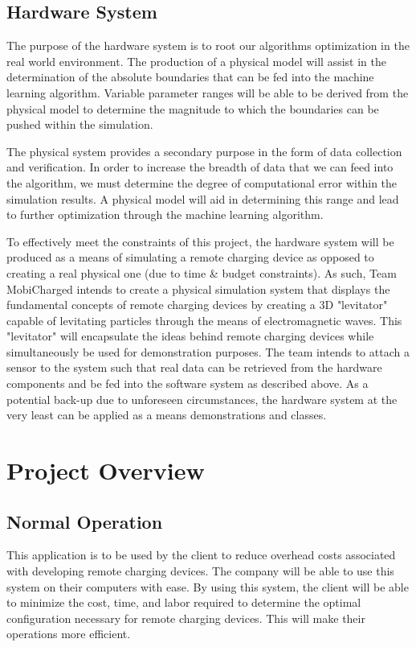 \documentclass[12pt, titlepage]{article}
\begin{document}
\subsection{Hardware System}
The purpose of the hardware system is to root our algorithms optimization in the real world environment. The production of a physical model will assist in the determination of the absolute boundaries that can be fed into the machine learning algorithm. Variable parameter ranges will be able to be derived from the physical model to determine the magnitude to which the boundaries can be pushed within the simulation. 
\par
The physical system provides a secondary purpose in the form of data collection and verification. In order to increase the breadth of data that we can feed into the algorithm, we must determine the degree of computational error within the simulation results. A physical model will aid in determining this range and lead to further optimization through the machine learning algorithm. 
\par
To effectively meet the constraints of this project, the hardware system will be produced as a means of simulating a remote charging device as opposed to creating a real physical one (due to time \& budget constraints). As such, Team MobiCharged intends to create a physical simulation system that displays the fundamental concepts of remote charging devices by creating a 3D "levitator" capable of levitating particles through the means of electromagnetic waves. This "levitator" will encapsulate the ideas behind remote charging devices while simultaneously be used for demonstration purposes. The team intends to attach a sensor to the system such that real data can be retrieved from the hardware components and be fed into the software system as described above. As a potential back-up due to unforeseen circumstances, the hardware system at the very least can be applied as a means demonstrations and classes.   

\section{Project Overview}
\subsection{Normal Operation}
This application is to be used by the client to reduce overhead costs associated with developing remote charging devices. The company will be able to use this system on their computers with ease. By using this system, the client will be able to minimize the cost, time, and labor required to determine the optimal configuration necessary for remote charging devices. This will make their operations more efficient.
\end{document}
